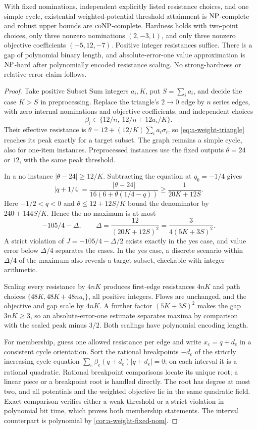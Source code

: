 \begin{theorem}
\label{thm:a-weight-cycle-hard}
With fixed nominations, independent explicitly listed resistance choices,
and one simple cycle, existential weighted-potential threshold attainment
is $\mathrm{NP}$-complete and robust upper bounds are $\mathrm{coNP}$-complete.
Hardness holds with two-point choices, only three nonzero nominations
$(2,-3,1)$, and only three nonzero objective coefficients $(-5,12,-7)$.
Positive integer resistances suffice. There is a gap of polynomial binary
length, and absolute-error-one value approximation is $\mathrm{NP}$-hard after
polynomially encoded resistance scaling. No strong-hardness or
relative-error claim follows.
\end{theorem}
\begin{proof}
Take positive Subset Sum integers $a_i,K$, put $S=\sum_i a_i$, and
decide the case $K>S$ in preprocessing. Replace the triangle's $2\to0$
edge by $n$ series edges, with zero internal nominations and objective
coefficients, and independent choices
\[
 \beta_i\in\{12/n,\ 12/n+12a_i/K\}.
\]
Their effective resistance is $\theta=12+(12/K)\sum_i a_i\sigma_i$,
so \cref{eq:a-weight-triangle} reaches its peak exactly for a target
subset. The graph remains a simple cycle, also for one-item instances.
Preprocessed instances use the fixed outputs $\theta=24$ or $12$,
with the same peak threshold.

In a no instance $|\theta-24|\ge12/K$. Subtracting the equation at
$q_0=-1/4$ gives
\[
 |q+1/4|=\frac{|\theta-24|}{16(6+\theta(1/4-q))}
 \ge\frac1{20K+12S}.
\]
Here $-1/2<q<0$ and $\theta\le12+12S/K$ bound the denominator by
$240+144S/K$. Hence the no maximum is at most
\[
 -105/4-\Delta,\qquad
 \Delta=\frac{12}{(20K+12S)^2}
       =\frac3{4(5K+3S)^2}.
\]
A strict violation of $J=-105/4-\Delta/2$ exists exactly in the yes
case, and value error below $\Delta/4$ separates the cases. In the yes
case, a discrete scenario within $\Delta/4$ of the maximum also reveals
a target subset, checkable with integer arithmetic.

Scaling every resistance by $4nK$ produces first-edge resistances
$4nK$ and path choices $\{48K,48K+48na_i\}$, all positive integers.
Flows are unchanged, and the objective and gap scale by $4nK$.
A further factor $(5K+3S)^2$ makes the gap $3nK\ge3$, so an
absolute-error-one estimate separates maxima by comparison with the
scaled peak minus $3/2$. Both scalings have polynomial encoding length.

For membership, guess one allowed resistance per edge and write
$x_e=q+d_e$ in a consistent cycle orientation. Sort the rational
breakpoints $-d_e$ of the strictly increasing cycle equation
$\sum_e\beta_e(q+d_e)|q+d_e|=0$; on each interval it is a rational
quadratic. Rational breakpoint comparisons locate its unique root;
a linear piece or a breakpoint root is handled directly. The root has
degree at most two, and all potentials and the weighted objective lie
in the same quadratic field. Exact comparison verifies either a weak
threshold or a strict violation in polynomial bit time, which proves
both membership statements. The interval counterpart is polynomial by
\cref{cor:a-weight-fixed-nom}.
\end{proof}

